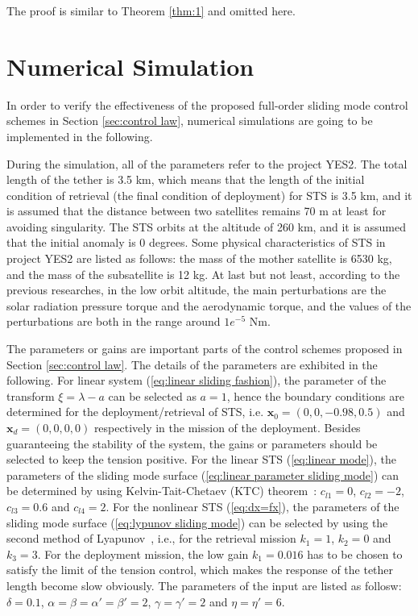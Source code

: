 \documentclass[conference]{IEEEtran}
\theoremstyle{plain}
\begin{document}
\begin{IEEEproof}
The proof is similar to Theorem \ref{thm:1} and omitted here.
\end{IEEEproof}
\section{Numerical Simulation}\label{sec:numerical simulation}
In order to verify the effectiveness of the proposed full-order sliding mode control schemes in Section \ref{sec:control law}, numerical simulations are going to be implemented in the following.\par
During the simulation, all of the parameters refer to the project YES2. The total length of the tether is 3.5 km, which means that the length of the initial condition of retrieval (the final condition of deployment) for STS is 3.5 km, and it is assumed that the distance between two satellites remains 70 m at least for avoiding singularity. The STS orbits at the altitude of 260 km, and it is assumed that the initial anomaly is 0 degrees. Some physical characteristics of STS in project YES2 are listed as follows: the mass of the mother satellite is 6530 kg, and the mass of the subsatellite is 12 kg. At last but not least, according to the previous researches, in the low orbit altitude, the main perturbations are the solar radiation pressure torque and the aerodynamic torque, and the values of the perturbations are both in the range around $1e^{-5}$ Nm.\par
The parameters or gains are important parts of the control schemes proposed in Section \ref{sec:control law}. The details of the parameters are exhibited in the following. For linear system (\ref{eq:linear sliding fashion}), the parameter of the transform $\xi = \lambda - a$ can be selected as $a=1$, hence the boundary conditions are determined for the deployment/retrieval of STS, i.e. $\bm{x}_0=(0,0,-0.98,0.5)$ and $\bm{x}_d=(0,0,0,0)$ respectively in the mission of the deployment. Besides guaranteeing the stability of the system, the gains or parameters should be selected to keep the tension positive. For the linear STS (\ref{eq:linear mode}), the parameters of the sliding mode surface (\ref{eq:linear parameter sliding mode}) can be determined by using Kelvin-Tait-Chetaev (KTC) theorem~\cite{sun2014fractional}: $c_{l1}=0$, $c_{l2}=-2$, $c_{l3}=0.6$ and $c_{l4}=2$. For the nonlinear STS (\ref{eq:dx=fx}), the parameters of the sliding mode surface (\ref{eq:lypunov sliding mode}) can be selected by using the second method of Lyapunov~\cite{Vadali1991Feedback}, i.e., for the retrieval mission $k_1=1$, $k_2=0$ and $k_3=3$. For the deployment mission, the low gain $k_1=0.016$ has to be chosen to satisfy the limit of the tension control, which makes the response of the tether length become slow obviously. The parameters of the input are listed as follosw: $\delta = 0.1$, $\alpha=\beta=\alpha'=\beta'=2$, $\gamma=\gamma'=2$ and $\eta=\eta'=6$.\par
\end{document}
